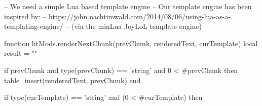 
\startchapter[title=The Lua Rendering Engine]

\startLuaCode

-- We need a simple Lua based template engine
-- Our template engine has been inspired by:
--   https://john.nachtimwald.com/2014/08/06/using-lua-as-a-templating-engine/
-- (via the minLua JoyLoL template engine)

function litMods.renderNextChunk(prevChunk, renderedText, curTemplate)
  local result = ""
  
  if prevChunk
    and type(prevChunk) == 'string'
    and 0 < #prevChunk then
    table_insert(renderedText, prevChunk)
  end
  
  if type(curTemplate) == 'string' and (0 < #curTemplate) then
